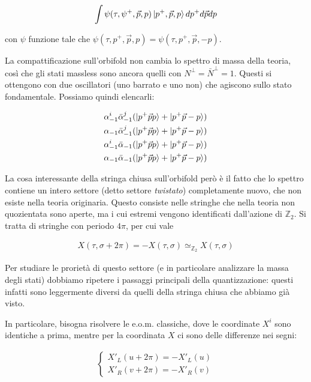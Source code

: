 \documentclass{report}
\begin{document}
\begin{align}
    \int \psi (\tau, \psi^+, \vec{p}, p) \ket{p^+, \vec{p}, p}dp^+ d\vec{p}dp
\end{align}

con \(\psi\) funzione tale che \(\psi(\tau, p^+, \vec{p}, p) = \psi(\tau, p^+, \vec{p}, -p)\). 

La compattificazione sull'orbifold non cambia lo spettro di massa della teoria, così che gli stati massless sono ancora quelli con \(N^\perp = \bar{N}^\perp = 1\). Questi si ottengono con due oscillatori (uno barrato e uno non) che agiscono sullo stato fondamentale. Possiamo quindi elencarli: 

\begin{align}
    &\alpha^i_{-1}\bar{\alpha}^j_{-1}(\ket{p^+ \vec{p} p} + \ket{p^+ \vec{p} -p}) \notag \\
    &\alpha_{-1}\bar{\alpha}^j_{-1}(\ket{p^+ \vec{p} p} + \ket{p^+ \vec{p} -p}) \notag \\
    &\alpha^i_{-1}\bar{\alpha}_{-1}(\ket{p^+ \vec{p} p} + \ket{p^+ \vec{p} -p}) \notag \\
    &\alpha_{-1}\bar{\alpha}_{-1}(\ket{p^+ \vec{p} p} + \ket{p^+ \vec{p} -p})
\end{align}

La cosa interessante della stringa chiusa sull'orbifold però è il fatto che lo spettro contiene un intero settore (detto settore \emph{twistato}) completamente nuovo, che non esiste nella teoria originaria. Questo consiste nelle stringhe che nella teoria non quozientata sono aperte, ma i cui estremi vengono identificati dall'azione di \(\mathbb{Z}_2\). Si tratta di stringhe con periodo \(4\pi\), per cui vale 

\begin{align}
    X (\tau, \sigma +2\pi) = -X(\tau, \sigma) \simeq_{\mathbb{Z}_2} X (\tau, \sigma)
\end{align}

Per studiare le prorietà di questo settore (e in particolare analizzare la massa degli stati) dobbiamo ripetere i passaggi principali della quantizzazione: questi infatti sono leggermente diversi da quelli della stringa chiusa che abbiamo già visto. 

In particolare, bisogna risolvere le e.o.m. classiche, dove le coordinate \(X^i\) sono identiche a prima, mentre per la coordinata \(X\) ci sono delle differenze nei segni: 

\begin{align}
    \begin{cases}
    X'_L (u+2\pi) = -X'_L (u) \\
    X'_R (v+2\pi) = -X'_R (v)
    \end{cases}
\end{align}
\end{document}
